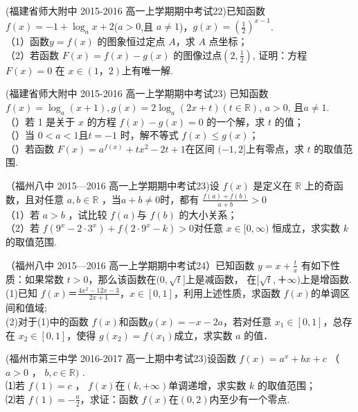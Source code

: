 (福建省师大附中 2015-2016 高一上学期期中考试22)已知函数$f(x)=-1+\log_a{x+2}$($a>0$,且 $a \neq1$)，$g(x)=(\frac12)^{x-1}$.\\
（1）函数$ y= f (x )$ 的图象恒过定点 $A$，求 $A$ 点坐标；\\
（2）若函数 $F ( x )= f ( x )- g ( x )$ 的图像过点$(2,\frac12)$, 证明：方程 $F ( x )= 0$ 在 $x\in(1，2)$上有唯一解.


(福建省师大附中 2015-2016 高一上学期期中考试23) 已知函数 $f ( x ) =\log_a ( x+ 1), g ( x )= 2 \log_a ( 2 x+ t )(t\in \mathbb{R})$, $a> 0$, 且$a\neq 1$.\\
（）若 1 是关于 $x$ 的方程 $f ( x) -g ( x) =0$ 的一个解，求 $t$ 的值；\\
（）当 $0< a< 1$且$t=-1$ 时，解不等式 $f ( x)\leq g ( x) $；\\
（）若函数 $F ( x)= a^{f ( x ) }+ tx^2- 2t+ 1 $在区间 $(-1,2]$上有零点，求 $t$ 的取值范围.


（福州八中 2015—2016 高一上学期期中考试23)设 $f (x )$ 是定义在 $\mathbb{R}$ 上的奇函数，且对任意 $a,b\in \mathbb{R}$ ，当$a+b\neq0$时，都有 $\frac{f(a)+f(b)}{a+b}>0$\\
（1）若 $a> b$ ，试比较 $f (a ) $与 $f (b)$ 的大小关系；\\
（2）若 $f (9^x- 2\cdot 3^x )+ f ( 2\cdot 9^x-k )> 0 $对任意 $x\in[0,\infty )$ 恒成立，求实数 $k$ 的取值范围.


（福州八中 2015—2016 高一上学期期中考试24）已知函数 $y=x+\frac tx$ 有如下性质：如果常数 $t>0$，那么该函数在$(0,\sqrt t]$上是减函数， 在$[\sqrt t, ＋\infty)$上是增函数.\\
(1)已知 $f(x)＝\frac{4x^2-12x-3}{2x+1} $，$x\in[0,1]$，利用上述性质，求函数 $f(x)$的单调区间和值域;\\
(2)对于(1)中的函数 $f(x)$和函数$g(x)=-x-2a$，若对任意 $x_1 \in[0,1]$，总存在 $x_2\in[0,1]$，使得 $g(x_2 )=f(x_1 ) $成立，求实数 $a$ 的值．


(福州市第三中学 2016-2017 高一上期中考试23)设函数 $f (x)=a^x+ bx +c$ （ $a> 0$ ， $b, c\in \mathbb{R})$ . \\
⑴若 $f (1)= c$ ， $f (x)$在$( k,+\infty)$单调递增，求实数 $k$ 的取值范围；\\
 ⑵若 $f( 1)=-\frac a2$，求证：函数 $f (x) $在$( 0,2) $内至少有一个零点.


